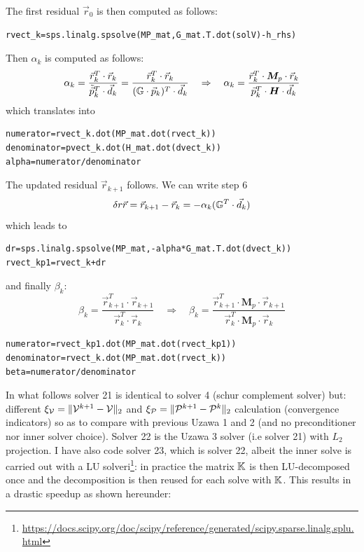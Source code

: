 The first residual $\vec{r}_0$ is then computed as follows:
\begin{lstlisting}
rvect_k=sps.linalg.spsolve(MP_mat,G_mat.T.dot(solV)-h_rhs) 
\end{lstlisting}
Then $\alpha_k$ is computed as follows:
\[
\alpha_k
= \frac{ \vec{r}_k^T \cdot  \vec{r}_k } { \tilde{\vec{p}}_k^T \cdot \vec{d}_k }
= \frac{ \vec{r}_k^T \cdot  \vec{r}_k } {({\mathbb{G}} \cdot  \vec{p}_k)^T \cdot \vec{d}_k }
\quad
\Rightarrow
\quad
\alpha_k
= \frac{ \vec{r}_k^T \cdot {\bm M}_p \cdot \vec{r}_k } {\vec{p}_k^T \cdot {\bm H} \cdot \vec{d}_k }
\]
which translates into
\begin{lstlisting}
numerator=rvect_k.dot(MP_mat.dot(rvect_k))     
denominator=pvect_k.dot(H_mat.dot(dvect_k))   
alpha=numerator/denominator                  
\end{lstlisting}
The updated residual $\vec{r}_{k+1}$ follows. 
We can write step 6 
\[
\delta r\vec{r} = \vec{r}_{k+1} - \vec{r}_k = - \alpha_k ({\mathbb{G}}^T \cdot \vec{d}_k ) 
\]
which leads to
\begin{lstlisting}
dr=sps.linalg.spsolve(MP_mat,-alpha*G_mat.T.dot(dvect_k)) 
rvect_kp1=rvect_k+dr     
\end{lstlisting}
and finally $\beta_k$:
\[
\beta_k= \frac{ \vec{r}_{k+1}^T \cdot \vec{r}_{k+1} } { \vec{r}_k^T \cdot \vec{r}_k }
\quad
\Rightarrow
\quad
\beta_k= \frac{ \vec{r}_{k+1}^T \cdot {\bm M}_p \cdot \vec{r}_{k+1} }
{ \vec{r}_k^T \cdot {\bm M}_p \cdot \vec{r}_k }
\]
\begin{lstlisting}
numerator=rvect_kp1.dot(MP_mat.dot(rvect_kp1)) 
denominator=rvect_k.dot(MP_mat.dot(rvect_k))  
beta=numerator/denominator                   
\end{lstlisting}

In what follows solver 21 is identical to solver 4 (schur complement solver) but: 
different $\xi_{\cal V}=\|{\cal V}^{k+1}-{\cal V}\|_2$ and 
$\xi_{\cal P}=\|{\cal P}^{k+1}-{\cal P}^k\|_2$ calculation (convergence indicators) so as to 
compare with previous Uzawa 1 and 2 (and no preconditioner nor inner solver choice). 
Solver 22 is the Uzawa 3 solver (i.e solver 21) with $L_2$ projection.
I have also code solver 23, which is solver 22, albeit the inner solve 
is carried out with a LU solveri\footnote{\url{https://docs.scipy.org/doc/scipy/reference/generated/scipy.sparse.linalg.splu.html}}: 
in practice the matrix ${\mathbb{K}}$ is then LU-decomposed once and the decomposition 
is then reused for each solve with ${\mathbb{K}}$. This results in a drastic
speedup as shown hereunder:

